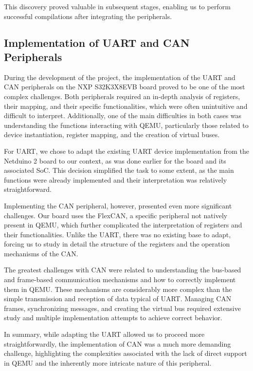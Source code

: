 This discovery proved valuable in subsequent stages, enabling us to perform successful compilations after integrating the peripherals.


\subsection{Implementation of UART and CAN Peripherals}
During the development of the project, the implementation of the UART and CAN peripherals on the NXP S32K3X8EVB board proved to be one of the most complex challenges. Both peripherals required an in-depth analysis of registers, their mapping, and their specific functionalities, which were often unintuitive and difficult to interpret. Additionally, one of the main difficulties in both cases was understanding the functions interacting with QEMU, particularly those related to device instantiation, register mapping, and the creation of virtual buses.

For UART, we chose to adapt the existing UART device implementation from the Netduino 2 board to our context, as was done earlier for the board and its associated SoC. This decision simplified the task to some extent, as the main functions were already implemented and their interpretation was relatively straightforward.

Implementing the CAN peripheral, however, presented even more significant challenges. Our board uses the FlexCAN, a specific peripheral not natively present in QEMU, which further complicated the interpretation of registers and their functionalities. Unlike the UART, there was no existing base to adapt, forcing us to study in detail the structure of the registers and the operation mechanisms of the CAN.

The greatest challenges with CAN were related to understanding the bus-based and frame-based communication mechanisms and how to correctly implement them in QEMU. These mechanisms are considerably more complex than the simple transmission and reception of data typical of UART. Managing CAN frames, synchronizing messages, and creating the virtual bus required extensive study and multiple implementation attempts to achieve correct behavior.

In summary, while adapting the UART allowed us to proceed more straightforwardly, the implementation of CAN was a much more demanding challenge, highlighting the complexities associated with the lack of direct support in QEMU and the inherently more intricate nature of this peripheral.


